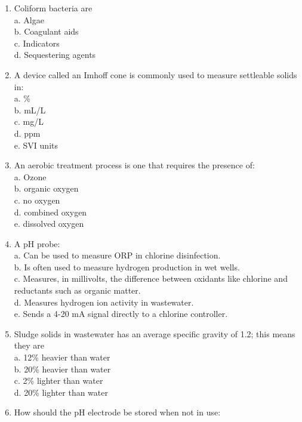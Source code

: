 \begin{tcolorbox}[breakable, enhanced,
colframe=blue!25,
colback=blue!10,
coltitle=blue!20!black,  
title= Chapter Assessment]
\begin{enumerate}
\item Coliform bacteria are \\

a. Algae \\
b. Coagulant aids \\
c. Indicators \\
d. Sequestering agents 

\item A device called an Imhoff cone is commonly used to measure settleable solids in: \\

a. \% \\
b. mL/L \\
c. mg/L \\
d. ppm \\
e. SVI units 

\item An aerobic treatment process is one that requires the presence of: \\

a. Ozone \\
b. organic oxygen \\
c. no oxygen \\
d. combined oxygen \\
e. dissolved oxygen 

\item A pH probe: \\

a. Can be used to measure ORP in chlorine disinfection. \\
b. Is often used to measure hydrogen production in wet wells. \\
c. Measures, in millivolts, the difference between oxidants like chlorine and reductants such as organic matter. \\
d. Measures hydrogen ion activity in wastewater. \\
e. Sends a 4-20 mA signal directly to a chlorine controller. 

\item Sludge solids in wastewater has an average specific gravity of 1.2; this means they are \\

a. 12\% heavier than water \\
b. 20\% heavier than water \\
c. 2\% lighter than water \\
d. 20\% lighter than water 

\item How should the pH electrode be stored when not in use: \\


\end{enumerate}
\end{tcolorbox}
